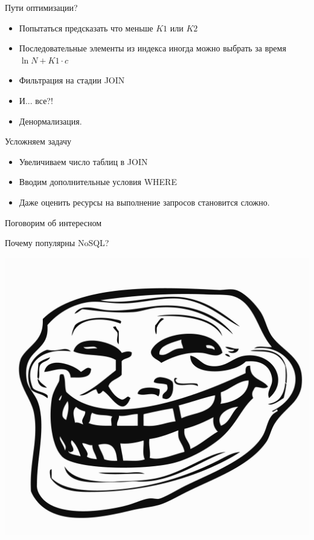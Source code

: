 \documentclass[aspectratio=169]{beamer}
\begin{document}
\begin{frame}{Пути оптимизации?}
    \begin{itemize}
        \item Попытаться предсказать что меньше $K1$ или $K2$
        \item Последовательные элементы из индекса иногда
            можно выбрать за время $\ln{N} + K1 \cdot c$
        \item Фильтрация на стадии JOIN

        \item И... все?!

        \pause\item Денормализация.
    \end{itemize}
\end{frame}

\begin{frame}{Усложняем задачу}
    \begin{itemize}
        \item Увеличиваем число таблиц в JOIN
        \item Вводим дополнительные условия WHERE
        \item Даже оценить ресурсы на выполнение запросов
            становится сложно.
    \end{itemize}
\end{frame}

\begin{frame}{Поговорим об интересном}
    \begin{block}
        {\huge Почему популярны NoSQL?}
        \begin{center}
            \pause\includegraphics[scale=0.2]{img/Trollface_HD.png}
        \end{center}
    \end{block}
\end{frame}
\end{document}
